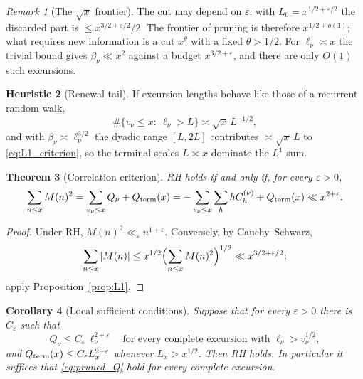 \documentclass[11pt]{amsart}
\numberwithin{equation}{section}
\theoremstyle{plain}
\newtheorem{theorem}{Theorem}[section]
\newtheorem{corollary}[theorem]{Corollary}
\theoremstyle{definition}
\newtheorem{heuristic}[theorem]{Heuristic}
\theoremstyle{remark}
\newtheorem{remark}[theorem]{Remark}
\newcommand{\eps}{\varepsilon}
\begin{document}
\begin{remark}[The $\sqrt{x}$ frontier]
\label{rem:sqrt_frontier}
The cut may depend on $\eps$: with $L_0=x^{1/2+\eps/2}$ the discarded part is
$\le x^{3/2+\eps/2}/2$. The frontier of pruning is therefore $x^{1/2+o(1)}$;
what requires new information is a cut $x^{\theta}$ with a fixed
$\theta>1/2$. For $\ell_\nu\asymp x$ the trivial bound gives
$\beta_\nu\ll x^2$ against a budget $x^{3/2+\eps}$, and there are only
$O(1)$ such excursions.
\end{remark}

\begin{heuristic}[Renewal tail]
\label{heu:renewal}
If excursion lengths behave like those of a recurrent random walk,
\begin{equation}
\label{eq:renewal_tail}
  \#\{v_\nu\le x:\ \ell_\nu>L\}\asymp\sqrt{x}\,L^{-1/2},
\end{equation}
and with $\beta_\nu\asymp\ell_\nu^{3/2}$ the dyadic range $[L,2L]$
contributes $\asymp\sqrt{x}\,L$ to \eqref{eq:L1_criterion}, so the terminal
scales $L\asymp x$ dominate the $L^1$ sum.
\end{heuristic}

\begin{theorem}[Correlation criterion]
\label{thm:corr-criterion}
RH holds if and only if, for every $\eps>0$,
\begin{equation}
\label{eq:RH-corr}
  \sum_{n\le x}M(n)^2=\sum_{v_\nu\le x}Q_\nu+Q_{\rm term}(x)
  =-\sum_{v_\nu\le x}\sum_{h}hC^{(\nu)}_h+Q_{\rm term}(x)\ll x^{2+\eps}.
\end{equation}
\end{theorem}

\begin{proof}
Under RH, $M(n)^2\ll_\eps n^{1+\eps}$. Conversely, by Cauchy--Schwarz,
\[
\sum_{n\le x}|M(n)|\le x^{1/2}\Bigl(\sum_{n\le x}M(n)^2\Bigr)^{1/2}\ll x^{3/2+\eps/2};
\]
apply
Proposition~\ref{prop:L1}.
\end{proof}

\begin{corollary}[Local sufficient conditions]
\label{cor:local-corr-sufficient}
\label{cor:pruned_local}
Suppose that for every $\eps>0$ there is $C_\eps$ such that
\begin{equation}
\label{eq:pruned_Q}
  Q_\nu\le C_\eps\,\ell_\nu^{2+\eps}\quad\text{for every complete excursion with }
  \ell_\nu>v_\nu^{1/2},
\end{equation}
and $Q_{\rm term}(x)\le C_\eps L_x^{2+\eps}$ whenever $L_x>x^{1/2}$. Then RH
holds. In particular it suffices that \eqref{eq:pruned_Q} hold for every
complete excursion.
\end{corollary}
\end{document}
